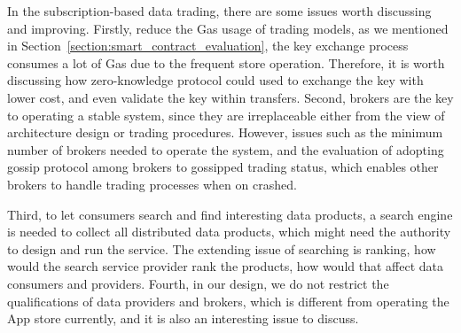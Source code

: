 \begin{spacing}{2.0}

In the subscription-based data trading, there are some issues worth discussing and improving. Firstly, reduce the Gas usage of trading models, as we mentioned in Section~\ref{section:smart_contract_evaluation}, the key exchange process consumes a lot of Gas due to the frequent store operation. Therefore, it is worth discussing how zero-knowledge protocol could used to exchange the key with lower cost, and even validate the key within transfers. Second, brokers are the key to operating a stable system, since they are irreplaceable either from the view of architecture design or trading procedures. However, issues such as the minimum number of brokers needed to operate the system, and the evaluation of adopting gossip protocol among brokers to gossipped trading status, which enables other brokers to handle trading processes when on crashed.

Third, to let consumers search and find interesting data products, a search engine is needed to collect all distributed data products, which might need the authority to design and run the service. The extending issue of searching is ranking, how would the search service provider rank the products, how would that affect data consumers and providers. Fourth, in our design, we do not restrict the qualifications of data providers and brokers, which is different from operating the App store currently, and it is also an interesting issue to discuss.


\end{spacing}

\clearpage
{}


\singlespacing
\newpage
{}
\renewcommand\bibname{References}	%


\clearpage
{}


